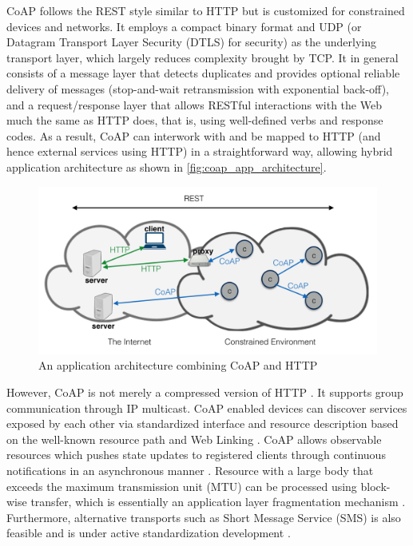 CoAP follows the REST style similar to HTTP but is customized for constrained devices and networks. It employs a compact binary format and UDP (or Datagram Transport Layer Security (DTLS) for security) as the underlying transport layer, which largely reduces complexity brought by TCP. It in general consists of a message layer that detects duplicates and provides optional reliable delivery of messages (stop-and-wait retransmission with exponential back-off), and a request/response layer that allows RESTful interactions with the Web much the same as HTTP does, that is, using well-defined verbs and response codes. As a result, CoAP can interwork with  and be mapped to HTTP (and hence external services using HTTP) in a straightforward way, allowing hybrid application architecture as shown in \autoref{fig:coap_app_architecture}.

\begin{figure}[!htbp]
\centering
\includegraphics[scale = 0.55]{coap_app_architecture.png}
\caption{An application architecture combining CoAP and HTTP}
\label{fig:coap_app_architecture}
\end{figure}

However, CoAP is not merely a compressed version of HTTP \autocite{6159216}. It supports group communication through IP multicast. CoAP enabled devices can discover services exposed by each other via standardized interface and resource description based on the well-known resource path and Web Linking  \autocite{well_known_pattern, web_link, core_link}. CoAP allows observable resources which pushes state updates to registered clients through continuous notifications in an asynchronous manner \autocite{coap_observe}. Resource with a large body that exceeds the maximum transmission unit (MTU) can be processed using block-wise transfer, which is essentially an application layer fragmentation mechanism \autocite{blockwise}. Furthermore, alternative transports such as Short Message Service (SMS) is also feasible and is under active standardization development \autocite{coap_alter_trans}.

